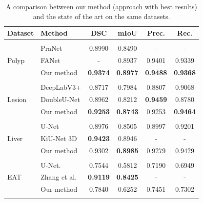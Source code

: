 \begin{table}[t]
\centering
\def\arraystretch{1.25}
\begin{tabular}{l l c c c c} 
 \hline
 Dataset & Method & DSC & mIoU & Prec. & Rec. \\ 
 \hline \\ [-1.5ex]
 
 \multirow{3}{1em}{{Polyp}}
& PraNet \cite{fanPraNetParallelReverse2020} & 0.8990 & 0.8490 & - & - \\
& FANet \cite{tomarFANetFeedbackAttention2021a} & - & 0.8937 & 0.9401 & 0.9339 \\
& Our method & \textbf{0.9374} & \textbf{0.8977} & \textbf{0.9488} &  \textbf{0.9368} \\ [1ex]
\hline \\ [-1.5ex]

 \multirow{3}{1em}{{Lesion}}
& DeepLabV3+ \cite{chenEncoderDecoderAtrousSeparable2018} & 0.8717 & 0.7984 & 0.8807 & 0.9068 \\
& DoubleU-Net \cite{jhaDoubleUNetDeepConvolutional2020} & 0.8962 & 0.8212 & \textbf{0.9459} & 0.8780 \\
& Our method & \textbf{0.9253} & \textbf{0.8743} & 0.9253 &  \textbf{0.9464} \\ [1ex]
\hline \\ [-1.5ex]

 \multirow{3}{1em}{{Liver}}
& U-Net \cite{ronnebergerUNetConvolutionalNetworks2015} & 0.8976 & 0.8505 & 0.8997 & 0.9201 \\
& KiU-Net 3D \cite{valanarasuKiUNetOvercompleteConvolutional2020a} & \textbf{0.9423} & 0.8946 & - & - \\
& Our method & 0.9302 & \textbf{0.8985} & 0.9279 & 0.9429 \\ [1ex]
\hline \\ [-1.5ex]

 \multirow{3}{1em}{{EAT}}
& U-Net. \cite{ronnebergerUNetConvolutionalNetworks2015} & 0.7544 & 0.5812 & 0.7190 & 0.6949 \\
& Zhang et al. \cite{zhangAutomaticEpicardialFat2020a} & \textbf{0.9119} & \textbf{0.8425} & - & - \\
& Our method & 0.7840 & 0.6252 & 0.7451 &  0.7302 \\ [1ex]
\hline \\ [-1.5ex]

\end{tabular}
\caption{A comparison between our method (approach with best results) and the state of the art on the same datasets.}
\label{table:comparison}
\end{table}

